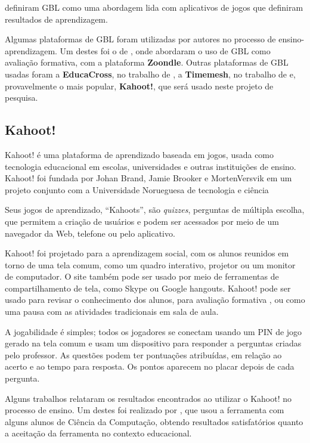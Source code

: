 \documentclass[
	12pt,				%
	openright,			%
	oneside,
	a4paper,			%
	english,			%
	french,				%
	spanish,			%
	brazil,				%
	]{abntex2}
\begin{document}
 definiram GBL como uma abordagem lida com aplicativos de jogos que definiram resultados de aprendizagem.

Algumas plataformas de GBL foram utilizadas por autores no processo de ensino-aprendizagem. Um destes foi o de , onde abordaram o uso de GBL como avaliação formativa, com a plataforma \textbf{Zoondle}. Outras plataformas de GBL usadas foram a \textbf{EducaCross}, no trabalho de , a \textbf{Timemesh}, no trabalho de  e, provavelmente o mais popular, \textbf{Kahoot!}, que será usado neste projeto de pesquisa.

\subsection{Kahoot!}
\label{sec:Kahoot!}
Kahoot! é uma plataforma de aprendizado baseada em jogos, usada como tecnologia educacional em escolas, universidades e outras instituições de ensino. Kahoot! foi fundada por Johan Brand, Jamie Brooker e MortenVersvik em um projeto conjunto com a Universidade Norueguesa de tecnologia e ciência \cite{kahoot2018}

Seus jogos de aprendizado, ``Kahoots'', são \textit{quizzes}, perguntas de múltipla escolha, que permitem a criação de usuários e podem ser acessados por meio de um navegador da Web, telefone ou pelo aplicativo.

Kahoot! foi projetado para a aprendizagem social, com os alunos reunidos em torno de uma tela comum, como um quadro interativo, projetor ou um monitor de computador. O site também pode ser usado por meio de ferramentas de compartilhamento de tela, como Skype ou Google hangouts. Kahoot! pode ser usado para revisar o conhecimento dos alunos, para avaliação formativa \cite{kahootFormative}, ou como uma pausa com as atividades tradicionais em sala de aula. 

A jogabilidade é simples; todos os jogadores se conectam usando um PIN de jogo gerado na tela comum e usam um dispositivo para responder a perguntas criadas pelo professor. As questões podem ter pontuações atribuídas, em relação ao acerto e ao tempo para resposta. Os pontos aparecem no placar depois de cada pergunta.

Alguns trabalhos relataram os resultados encontrados ao utilizar o Kahoot! no processo de ensino. Um destes foi realizado por , que usou a ferramenta com alguns alunos de Ciência da Computação, obtendo resultados satisfatórios quanto a aceitação da ferramenta no contexto educacional.
\end{document}
